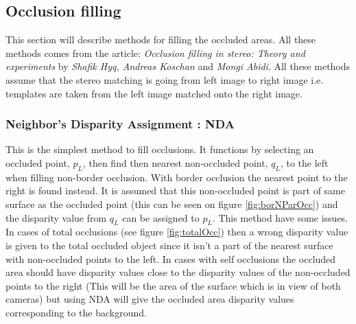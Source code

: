 \subsection{Occlusion filling}
This section will describe methods for filling the occluded areas. All these methods comes from the article: \textit{Occlusion filling in stereo: Theory and experiments} by \textit{Shafik Hyq, Andreas Koschan} and \textit{Mongi Abidi}. All these methods assume that the stereo matching is going from left image to right image i.e. templates are taken from the left image matched onto the right image.
 
\subsubsection{Neighbor's Disparity Assignment : NDA}
This is the simplest method to fill occlusions. It functions by selecting an occluded point, $p_L$, then find then nearest non-occluded point, $q_L$, to the left when filling non-border occlusion. With border occlusion the nearest point to the right is found instead. It is assumed that this non-occluded point is part of same surface as the occluded point (this can be seen on figure \ref{fig:borNParOcc}) and the disparity value from $q_L$ can be assigned to $p_L$. This method have some issues. In cases of total occlusions (see figure \ref{fig:totalOcc}) then a wrong disparity value is given to the total occluded object since it isn't a part of the nearest surface with non-occluded points to the left. In cases with self occlusions the occluded area should have disparity values close to the disparity values of the non-occluded points to the right (This will be the area of the surface which is in view of both cameras) but using NDA will give the occluded area disparity values corresponding to the background. 

